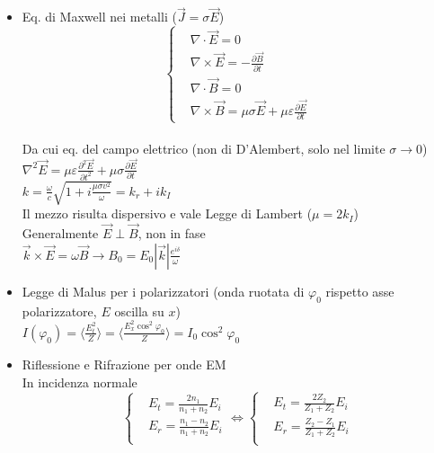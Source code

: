 \documentclass[a4paper]{article}
\begin{document}
\begin{itemize}
\item Eq. di Maxwell nei metalli ($\overrightarrow{J}=\sigma \overrightarrow{E}$)
\begin{equation*}
	\begin{cases}
		& \nabla \cdot \overrightarrow{E}=0\\
		& \nabla \times \overrightarrow{E}=-\frac{\partial \overrightarrow{B}}{\partial t}\\
		& \nabla \cdot \overrightarrow{B} = 0\\
		& \nabla \times \overrightarrow{B} =\mu \sigma \overrightarrow{E}+\mu\varepsilon\frac{\partial \overrightarrow{E}}{\partial t}
	\end{cases}
\end{equation*}\\
Da cui eq. del campo elettrico (non di D'Alembert, solo nel limite $\sigma \rightarrow 0$)\\
$\nabla^2 \overrightarrow{E}=\mu \varepsilon\frac{\partial^2 \overrightarrow{E}}{\partial t^2}+\mu \sigma\frac{\partial\overrightarrow{E}}{\partial t}$\\
$k=\frac{\omega}{c}\sqrt{1+i\frac{\mu \sigma v^2}{\omega}}=k_r+ik_I$\\
Il mezzo risulta dispersivo e vale Legge di Lambert ($\mu = 2k_I$)\\
Generalmente $\overrightarrow{E} \perp \overrightarrow{B}$, non in fase\\
$\overrightarrow{k}\times\overrightarrow{E}=\omega \overrightarrow{B} \rightarrow B_0=E_0|\overrightarrow{k}|\frac{e^{i\delta}}{\omega}$\\
\item Legge di Malus per i polarizzatori (onda ruotata di $\varphi_0$ rispetto asse polarizzatore, $E$ oscilla su $x$)\\
$I(\varphi_0)=\langle \frac{E_t^2}{Z} \rangle=\langle \frac{E_x^2 \cos^2\varphi_0}{Z} \rangle=I_0\cos^2 \varphi_0$
\item Riflessione e Rifrazione per onde EM\\
In incidenza normale
\begin{equation*}
	\begin{cases}
		& E_t=\frac{2n_1}{n_1+n_2}E_i\\
		& E_r=\frac{n_1-n_2}{n_1+n_2}E_i\\	
	\end{cases} \iff
	\begin{cases}
		& E_t=\frac{2Z_2}{Z_1+Z_2}E_i\\
		& E_r=\frac{Z_2-Z_1}{Z_1+Z_2}E_i\\	

\end{cases}
\end{equation*}
\end{itemize}
\end{document}
